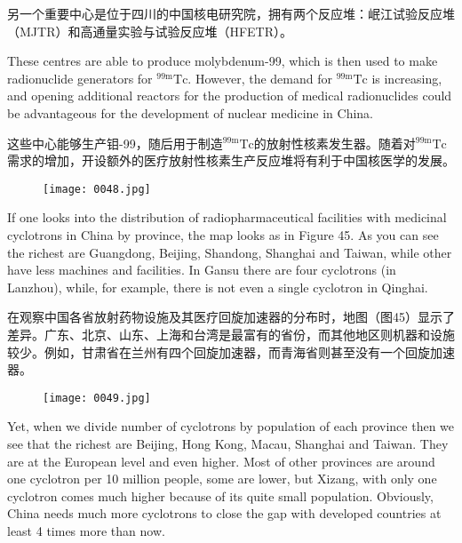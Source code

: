 \documentclass[dvipsnames, svgnames,a4paper,11pt]{article}
\begin{document}
另一个重要中心是位于四川的中国核电研究院，拥有两个反应堆：岷江试验反应堆（MJTR）和高通量实验与试验反应堆（HFETR）。

These centres are able to produce molybdenum-99, which is then used to make radionuclide generators for \(\mathrm{^{99m}Tc}\). However, the demand for \(\mathrm{^{99m}Tc}\) is increasing, and opening additional reactors for the production of medical radionuclides could be advantageous for the development of nuclear medicine in China.  

这些中心能够生产钼-99，随后用于制造${}^\text{99m}\text{Tc}$的放射性核素发生器。随着对${}^\text{99m}\text{Tc}$需求的增加，开设额外的医疗放射性核素生产反应堆将有利于中国核医学的发展。

\begin{figure}[ht]
      \centering
      \texttt{[image: 0048.jpg]}
       \label{fig44}
\end{figure}

If one looks into the distribution of radiopharmaceutical facilities with medicinal cyclotrons in China by province, the map looks as in Figure 45.  As you can see the richest are Guangdong, Beijing, Shandong, Shanghai and Taiwan, while other have less machines and facilities. In Gansu there are four cyclotrons (in Lanzhou), while, for example, there is not even a single cyclotron in Qinghai.

在观察中国各省放射药物设施及其医疗回旋加速器的分布时，地图（图45）显示了差异。广东、北京、山东、上海和台湾是最富有的省份，而其他地区则机器和设施较少。例如，甘肃省在兰州有四个回旋加速器，而青海省则甚至没有一个回旋加速器。

\begin{figure}[ht]
      \centering
      \texttt{[image: 0049.jpg]}
       \label{fig45}
\end{figure}

Yet, when we divide number of cyclotrons by population of each province then we see that the richest are Beijing, Hong Kong, Macau, Shanghai and Taiwan. They are at the European level and even higher. Most of other provinces are around one cyclotron per 10 million people, some are lower, but Xizang, with only one cyclotron comes much higher because of its quite small population. Obviously, China needs much more cyclotrons to close the gap with developed countries at least 4 times more than now.
\end{document}
